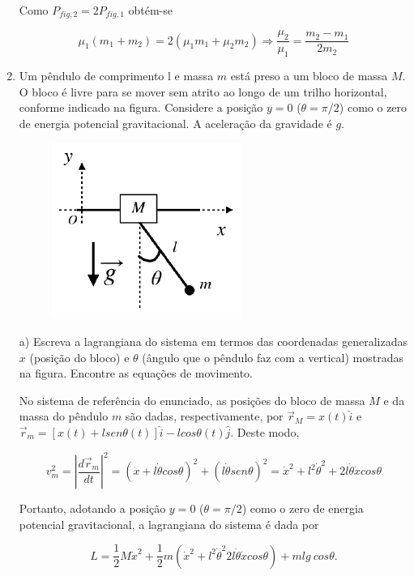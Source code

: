 \begin{enumerate}[start=1,label={\bfseries Q\arabic*.}]
Como $P_{fig,2} = 2P_{fig,1}$ obtém-se

$$
\mu_{1}(m_{1} + m_{2}) = 2(\mu_{1}m_{1} + \mu_{2}m_{2}) \Rightarrow \frac{\mu_{2}}{\mu_{1}} = \frac{m_{2} - m_{1}}{2m_{2}}
$$



\item Um pêndulo de comprimento l e massa $m$ está preso a um bloco de massa $M$. O bloco é livre para se mover sem atrito ao longo de um trilho horizontal, conforme indicado na figura. Considere a posição $y = 0$ ($\theta = \pi/2$) como o zero de energia potencial gravitacional. A aceleração da gravidade é $g$.

\begin{figure}[H]
\centering
\includegraphics[scale=0.5]{classica-img/pendulo.png}
\end{figure}


a) Escreva a lagrangiana do sistema em termos das coordenadas generalizadas $x$ (posição do bloco) e $\theta$ (ângulo que o pêndulo faz com a vertical) mostradas na figura. Encontre as equações de movimento.

\resposta

No sistema de referência do enunciado, as posições do bloco de massa $M$ e da massa do pêndulo $m$ são dadas, respectivamente, por $\vec{r}_{M} = x(t)\hat{i}$ e $\vec{r}_{m} = [x(t) + l sen\theta(t)]\hat{i} - l cos\theta(t)\hat{j}$. Deste modo,

$$
v_{m}^{2} = \left| \frac{d\vec{r}_{m}}{dt} \right|^{2} = \left( \dot{x} + l\dot{\theta} cos \theta  \right)^{2} + \left( l\dot{\theta} sen \theta \right)^{2} = \dot{x}^{2} + l^{2} \dot{\theta}^{2} + 2 l\dot{\theta}\dot{x}cos \theta
$$

Portanto, adotando a posição $y = 0$ ($\theta = \pi/2$) como o zero de energia potencial gravitacional, a lagrangiana do sistema é dada por

$$
L = \frac{1}{2} M \dot{x}^{2} + \frac{1}{2} m \left( \dot{x}^{2} + l^{2} \dot{\theta}^{2} 2 l\dot{\theta}\dot{x}cos \theta   \right) + mlg \ cos \theta.
$$


\end{enumerate}
